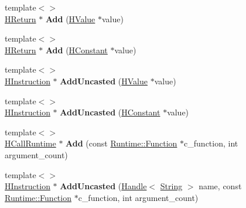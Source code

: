 \begin{DoxyCompactItemize}
\item 
{\footnotesize template$<$$>$ }\\\hyperlink{classv8_1_1internal_1_1_h_return}{H\+Return} $\ast$ {\bfseries Add} (\hyperlink{classv8_1_1internal_1_1_h_value}{H\+Value} $\ast$value)\hypertarget{classv8_1_1internal_1_1_h_graph_builder_a0b63c2c20363e038a8dcb583aafc1e29}{}\label{classv8_1_1internal_1_1_h_graph_builder_a0b63c2c20363e038a8dcb583aafc1e29}

\item 
{\footnotesize template$<$$>$ }\\\hyperlink{classv8_1_1internal_1_1_h_return}{H\+Return} $\ast$ {\bfseries Add} (\hyperlink{classv8_1_1internal_1_1_h_constant}{H\+Constant} $\ast$value)\hypertarget{classv8_1_1internal_1_1_h_graph_builder_adef4b9accd8c6c944c875d06d3ce8ed3}{}\label{classv8_1_1internal_1_1_h_graph_builder_adef4b9accd8c6c944c875d06d3ce8ed3}

\item 
{\footnotesize template$<$$>$ }\\\hyperlink{classv8_1_1internal_1_1_h_instruction}{H\+Instruction} $\ast$ {\bfseries Add\+Uncasted} (\hyperlink{classv8_1_1internal_1_1_h_value}{H\+Value} $\ast$value)\hypertarget{classv8_1_1internal_1_1_h_graph_builder_a2643fcfbc06f7c3f9427bdb6d57069ab}{}\label{classv8_1_1internal_1_1_h_graph_builder_a2643fcfbc06f7c3f9427bdb6d57069ab}

\item 
{\footnotesize template$<$$>$ }\\\hyperlink{classv8_1_1internal_1_1_h_instruction}{H\+Instruction} $\ast$ {\bfseries Add\+Uncasted} (\hyperlink{classv8_1_1internal_1_1_h_constant}{H\+Constant} $\ast$value)\hypertarget{classv8_1_1internal_1_1_h_graph_builder_a50b6c3ff1e04842c5e61a49518d63861}{}\label{classv8_1_1internal_1_1_h_graph_builder_a50b6c3ff1e04842c5e61a49518d63861}

\item 
{\footnotesize template$<$$>$ }\\\hyperlink{classv8_1_1internal_1_1_h_call_runtime}{H\+Call\+Runtime} $\ast$ {\bfseries Add} (const \hyperlink{structv8_1_1internal_1_1_runtime_1_1_function}{Runtime\+::\+Function} $\ast$c\+\_\+function, int argument\+\_\+count)\hypertarget{classv8_1_1internal_1_1_h_graph_builder_ac0af218c19e72101b633f60ac950b936}{}\label{classv8_1_1internal_1_1_h_graph_builder_ac0af218c19e72101b633f60ac950b936}

\item 
{\footnotesize template$<$$>$ }\\\hyperlink{classv8_1_1internal_1_1_h_instruction}{H\+Instruction} $\ast$ {\bfseries Add\+Uncasted} (\hyperlink{classv8_1_1internal_1_1_handle}{Handle}$<$ \hyperlink{classv8_1_1internal_1_1_string}{String} $>$ name, const \hyperlink{structv8_1_1internal_1_1_runtime_1_1_function}{Runtime\+::\+Function} $\ast$c\+\_\+function, int argument\+\_\+count)\hypertarget{classv8_1_1internal_1_1_h_graph_builder_a497b5cf5f6df26e1d7f351d7a5884a7c}{}\label{classv8_1_1internal_1_1_h_graph_builder_a497b5cf5f6df26e1d7f351d7a5884a7c}


\end{DoxyCompactItemize}
